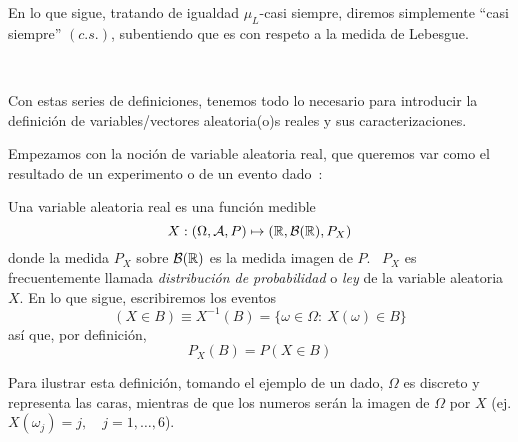 En lo que sigue, tratando  de igualdad $\mu_L$-casi siempre, diremos simplemente
``casi  siempre''  $(c.s.)$, subentiendo  que  es con  respeto  a  la medida  de
Lebesgue.

\

Con estas series  de definiciones, tenemos todo lo  necesario para introducir la
definici\'on de variables/vectores aleatoria(o)s reales y sus caracterizaciones.



\label{sec:MP:VAGeneral}

Empezamos con la  noci\'on de variable aleatoria real, que  queremos var como el
resultado de un experimento o de un evento dado~\cite{AthLah06, Coh13, Bre88}:
%
\begin{definicion}
  Una variable aleatoria real es una funci\'on medible
  \[
  X: (\Omega,\mathcal{A},P) \mapsto (\mathbb{R},\mathcal{B}(\mathbb{R}),P_X)
  \]
  donde la medida  $P_X$ sobre $\mathcal{B}(\mathbb{R})$ es la medida imagen  de $P$.  \ $P_X$
  es frecuentemente llamada {\it distribuci\'on  de probabilidad} o {\it ley} de
  la variable aleatoria $X$. En lo que sigue, escribiremos los eventos
  \[
  (X \in B) \equiv X^{-1}(B) = \{ \omega \in \Omega: \: X(\omega) \in B \}
  \]
  as\'i que, por definici\'on,
  \[
  P_X(B) = P(X \in B)
  \]
\end{definicion}
%
Para  ilustrar esta definici\'on,  tomando el  ejemplo de  un dado,  $\Omega$ es
discreto y representa  las caras, mientras de que los  numeros ser\'an la imagen
de $\Omega$ por $X$ (ej. $X(\omega_j) = j, \quad j = 1, \ldots , 6$).

